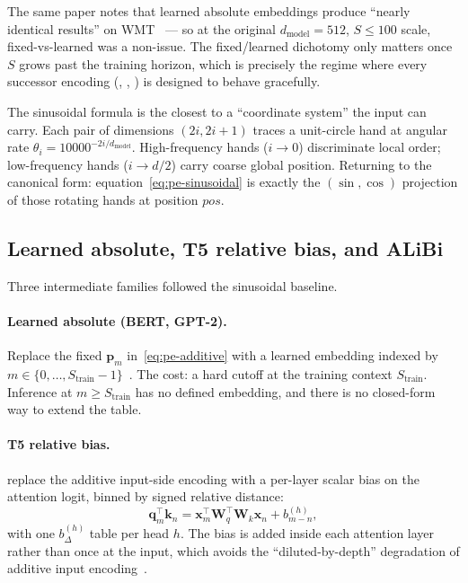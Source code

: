 The same paper notes that learned absolute embeddings produce
``nearly identical results'' on WMT~\citep[Table 3 row (E)]{vaswani2017}
--- so at the original $d_{\text{model}}=512$, $S \le 100$ scale,
fixed-vs-learned was a non-issue. The fixed/learned dichotomy only
matters once $S$ grows past the training horizon, which is
precisely the regime where every successor encoding (, ,
) is designed to behave gracefully.

\begin{intuition}
The sinusoidal formula is the closest to a ``coordinate system'' the
input can carry. Each pair of dimensions $(2i, 2i{+}1)$ traces a
unit-circle hand at angular rate $\theta_i = 10000^{-2i/d_{\text{model}}}$.
High-frequency hands ($i \to 0$) discriminate local order; low-frequency
hands ($i \to d/2$) carry coarse global position. Returning to the
canonical form: equation~\eqref{eq:pe-sinusoidal} is exactly the
$(\sin, \cos)$ projection of those rotating hands at position $pos$.
\end{intuition}

\subsection{Learned absolute, T5 relative bias, and ALiBi}
\label{sec:pos-learned-and-bias}

Three intermediate families followed the sinusoidal baseline.

\paragraph{Learned absolute (BERT, GPT-2).} Replace the fixed
$\boldsymbol{p}_m$ in~\eqref{eq:pe-additive} with a learned embedding
indexed by $m \in \{0, \ldots, S_{\text{train}}-1\}$~\citep{devlin2019-bert,
radford2019-gpt2}. The cost: a hard cutoff at the training context
$S_{\text{train}}$. Inference at $m \ge S_{\text{train}}$ has no defined
embedding, and there is no closed-form way to extend the table.

\paragraph{T5 relative bias.} \citet{raffel2019} replace the additive
input-side encoding with a per-layer scalar bias on the attention
logit, binned by signed relative distance:
\begin{equation}
\boldsymbol{q}_m^\top \boldsymbol{k}_n
= \boldsymbol{x}_m^\top \boldsymbol{W}_q^\top \boldsymbol{W}_k \boldsymbol{x}_n
  + b_{m-n}^{(h)},
\label{eq:t5-bias}
\end{equation}
with one $b_{\Delta}^{(h)}$ table per head $h$. The bias is added inside
each attention layer rather than once at the input, which avoids the
``diluted-by-depth'' degradation of additive input
encoding~\citep{raffel2019}.

